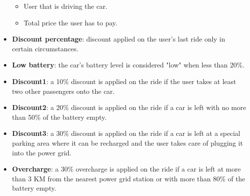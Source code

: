 \begin{itemize}
\begin{itemize}
		\item User that is driving the car.
		\item Total price the user has to pay.
	\end{itemize}
	\item \textbf{Discount percentage}: discount applied on the user's last ride only in certain circumstances. 
	\item \textbf{Low battery}: the car's battery level is considered "low" when less than 20\%. 
	\item \textbf{Discount1}: a 10\% discount is applied on the ride if the user takes at least two other passengers onto the car.
	\item \textbf{Discount2}: a 20\% discount is applied on the ride if a car is left with no more than 50\% of the battery empty.
	\item \textbf{Discount3}: a 30\% discount is applied on the ride if a car is left at a special parking area where it can be recharged and the user takes care of  plugging it into the power grid.
	\item \textbf{Overcharge}: a 30\% overcharge is applied on the ride if a car is left at more than 3 KM from the nearest power grid station or with more than 80\% of the battery empty.
\end{itemize}
\newpage
